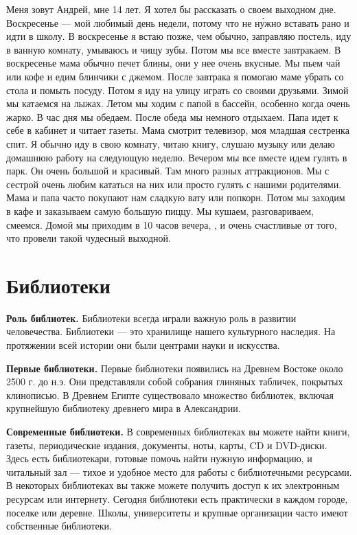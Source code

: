Меня зовут Андрей, мне 14 лет. Я хотел бы рассказать о своем выходном дне.
Воскресенье --- мой любимый день недели, потому что не н\'{у}жно вставать рано и идти в школу.
В воскресенье я встаю позже, чем обычно, заправляю постель, иду в ванную комнату, умываюсь и чищу зубы. Потом мы все вместе завтракаем. В воскресенье мама обычно печет блины, они у нее очень вкусные. Мы пьем чай или кофе и едим блинчики с джемом. После завтрака я помогаю маме убрать со стола и помыть посуду.
Потом я иду на улицу играть со своими друзьями. Зимой мы катаемся на лыжах. Летом мы ходим с папой в бассейн, особенно когда очень жарко.
В час дня мы обедаем.
После обеда мы немного отдыхаем. Папа идет к себе в кабинет и читает газеты. Мама смотрит телевизор, моя младшая сестренка спит. Я обычно иду в свою комнату, читаю книгу, слушаю музыку или делаю домашнюю работу на следующую неделю.
Вечером мы все вместе идем гулять в парк. Он очень большой и красивый. Там много разных аттракционов. Мы с сестрой очень любим кататься на них или просто гулять с нашими родителями. Мама и папа часто покупают нам сладкую вату или попкорн. Потом мы заходим в кафе и заказываем самую большую пиццу. Мы кушаем, разговариваем, смеемся.
Домой мы приходим в 10 часов вечера, ,  и очень счастливые от того, что провели такой чудесный выходной.



\section{Библиотеки}
\textbf{Роль библиотек.}
Библиотеки всегда играли важную роль в развитии человечества. Библиотеки --- это хранилище нашего культурного наследия. На протяжении всей истории они были центрами науки и искусства.

\textbf{Первые библиотеки.}
Первые библиотеки появились на Древнем Востоке около 2500 г. до н.э. Они представляли собой собрания глиняных табличек, покрытых клинописью. В Древнем Египте существовало множество библиотек, включая крупнейшую библиотеку древнего мира в Александрии.

\textbf{Современные библиотеки.}
В современных библиотеках вы можете найти книги, газеты, периодические издания, документы, ноты, карты, CD и DVD-диски. Здесь есть библиотекари, готовые помочь найти нужную информацию, и читальный зал --- тихое и удобное место для работы с библиотечными ресурсами.
В некоторых библиотеках вы также можете получить доступ к их электронным ресурсам или интернету. Сегодня библиотеки есть практически в каждом городе, поселке или деревне. Школы, университеты и крупные организации часто имеют собственные библиотеки.

